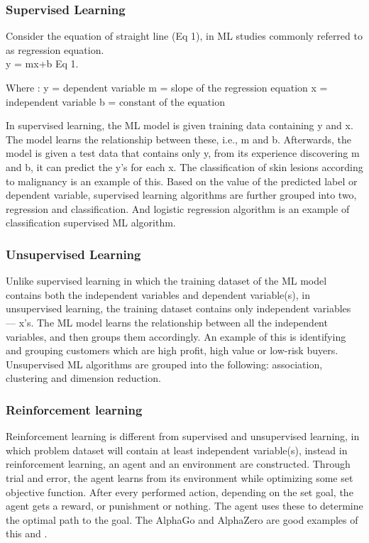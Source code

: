 \documentclass[conference]{IEEEtran}
\begin{document}
\subsubsection{Supervised Learning}
Consider the equation of straight line (Eq 1), in ML studies commonly referred to as regression equation.\\
   y = mx+b                 Eq 1.

Where :
y = dependent variable 
m = slope of the regression equation
x = independent variable
b = constant of the equation

In supervised learning, the ML model is given training data containing y and x. The model learns the relationship between these, i.e., m and b. Afterwards, the model is given a test data that contains only y, from its experience discovering m and b, it can predict the y’s for each x. The classification of skin lesions according to malignancy is an example of this.\cite{bb3} Based on the value of the predicted label or dependent variable, supervised learning algorithms are further grouped into two, regression and classification. And logistic regression algorithm is an example of classification supervised ML algorithm.

\subsubsection{Unsupervised Learning}
Unlike supervised learning in which the training dataset of the ML model contains both the independent variables and dependent variable(s), in unsupervised learning, the training dataset contains only independent variables — x’s. The ML model learns the relationship between all the independent variables, and then groups them accordingly. An example of this is identifying and grouping customers which are high profit, high value or low-risk buyers.\cite{bb4} Unsupervised ML algorithms are grouped into the following: association, clustering and dimension reduction.

\subsubsection{Reinforcement learning}
Reinforcement learning is different from supervised and unsupervised learning, in which problem dataset will contain at least independent variable(s), instead in reinforcement learning, an agent and an environment are constructed. Through trial and error, the agent learns from its environment while optimizing some set objective function. After every performed action, depending on the set goal, the agent gets a reward, or punishment or nothing. The agent uses these to determine the optimal path
to the goal. The AlphaGo and AlphaZero are good examples of this \cite{bb3} and \cite{bb5}.
\end{document}
